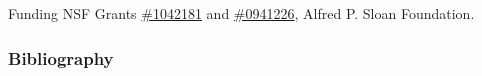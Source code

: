 

%

\begin{frame}
\begin{block}{Funding}
 NSF Grants 
\href{http://www.nsf.gov/awardsearch/showAward.do?AwardNumber=1042181}{\#1042181} 
and 
\href{http://www.nsf.gov/awardsearch/showAward.do?AwardNumber=0941226}{\#0941226},  Alfred P. Sloan Foundation.

\end{block}
\end{frame}

\begin{frame}[allowframebreaks]
\frametitle{Bibliography}

\tiny
%
	

%
%


\end{frame}


%

